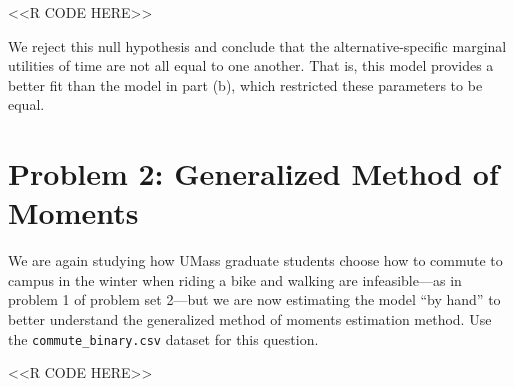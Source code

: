 \documentclass[11pt,letterpaper]{article}
\begin{document}
\begin{enumerate}[label=\alph*., leftmargin=*]
\begin{enumerate}[label=\roman*.]
		<<R CODE HERE>>

		We reject this null hypothesis and conclude that the alternative-specific marginal utilities of time are not all equal to one another. That is, this model provides a better fit than the model in part (b), which restricted these parameters to be equal.
	\end{enumerate}
\end{enumerate}

\section*{Problem 2: Generalized Method of Moments}

We are again studying how UMass graduate students choose how to commute to campus in the winter when riding a bike and walking are infeasible---as in problem 1 of problem set 2---but we are now estimating the model ``by hand'' to better understand the generalized method of moments estimation method. Use the \texttt{commute\_binary.csv} dataset for this question.

<<R CODE HERE>>
\end{document}

